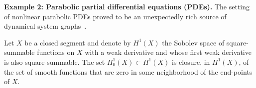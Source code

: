 \documentclass{article}
\def\gr{}
\newcommand{\eg}{{\it{e.g.}}}
\def\phi{\varphi}
\def\cS{{\cal S}}
\begin{document}


{\bf Example 2: Parabolic partial differential equations (PDEs).}
The setting of nonlinear parabolic PDEs proved to be an unexpectedly rich source of dynamical system graphs~\cite{HMW06,Lap19}.

Let $X$ be a closed segment and denote by $H^1(X)$ the Sobolev space of square-summable functions on $X$ with a weak derivative and whose first weak derivative is also square-summable. 
The set $H^1_0(X)\subset H^1(X)$ is closure, in $H^1(X)$, of the set of smooth functions that are zero in some neighborhood of the end-points of $X$. %
\end{document}
